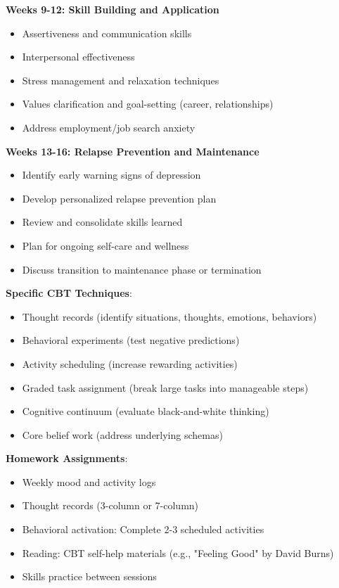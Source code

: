 \documentclass[11pt,letterpaper]{article}
\begin{document}
\textbf{Weeks 9-12: Skill Building and Application}
\begin{itemize}[leftmargin=*]
    \item Assertiveness and communication skills
    \item Interpersonal effectiveness
    \item Stress management and relaxation techniques
    \item Values clarification and goal-setting (career, relationships)
    \item Address employment/job search anxiety
\end{itemize}

\textbf{Weeks 13-16: Relapse Prevention and Maintenance}
\begin{itemize}[leftmargin=*]
    \item Identify early warning signs of depression
    \item Develop personalized relapse prevention plan
    \item Review and consolidate skills learned
    \item Plan for ongoing self-care and wellness
    \item Discuss transition to maintenance phase or termination
\end{itemize}

\textbf{Specific CBT Techniques}:
\begin{itemize}[leftmargin=*]
    \item Thought records (identify situations, thoughts, emotions, behaviors)
    \item Behavioral experiments (test negative predictions)
    \item Activity scheduling (increase rewarding activities)
    \item Graded task assignment (break large tasks into manageable steps)
    \item Cognitive continuum (evaluate black-and-white thinking)
    \item Core belief work (address underlying schemas)
\end{itemize}

\textbf{Homework Assignments}:
\begin{itemize}[leftmargin=*]
    \item Weekly mood and activity logs
    \item Thought records (3-column or 7-column)
    \item Behavioral activation: Complete 2-3 scheduled activities
    \item Reading: CBT self-help materials (e.g., "Feeling Good" by David Burns)
    \item Skills practice between sessions
\end{itemize}
\end{document}
